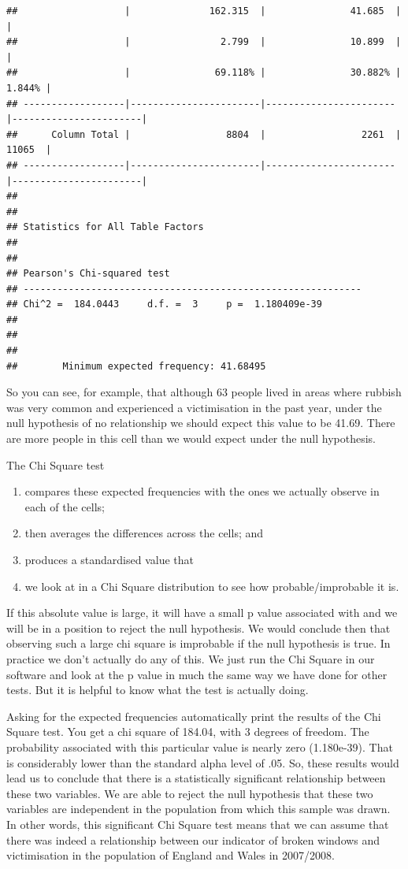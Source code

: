 \documentclass[]{book}
\providecommand{\tightlist}{%
  \setlength{\itemsep}{0pt}\setlength{\parskip}{0pt}}
\theoremstyle{definition}
\theoremstyle{definition}
\theoremstyle{definition}
\theoremstyle{remark}
\begin{document}
\begin{verbatim}
##                   |              162.315  |               41.685  |                       | 
##                   |                2.799  |               10.899  |                       | 
##                   |               69.118% |               30.882% |                1.844% | 
## ------------------|-----------------------|-----------------------|-----------------------|
##      Column Total |                 8804  |                 2261  |                11065  | 
## ------------------|-----------------------|-----------------------|-----------------------|
## 
##  
## Statistics for All Table Factors
## 
## 
## Pearson's Chi-squared test 
## ------------------------------------------------------------
## Chi^2 =  184.0443     d.f. =  3     p =  1.180409e-39 
## 
## 
##  
##        Minimum expected frequency: 41.68495
\end{verbatim}

So you can see, for example, that although 63 people lived in areas
where rubbish was very common and experienced a victimisation in the
past year, under the null hypothesis of no relationship we should expect
this value to be 41.69. There are more people in this cell than we would
expect under the null hypothesis.

The Chi Square test

\begin{enumerate}
\def\labelenumi{(\arabic{enumi})}
\tightlist
\item
  compares these expected frequencies with the ones we actually observe
  in each of the cells;
\item
  then averages the differences across the cells; and
\item
  produces a standardised value that
\item
  we look at in a Chi Square distribution to see how probable/improbable
  it is.
\end{enumerate}

If this absolute value is large, it will have a small p value associated
with and we will be in a position to reject the null hypothesis. We
would conclude then that observing such a large chi square is improbable
if the null hypothesis is true. In practice we don't actually do any of
this. We just run the Chi Square in our software and look at the p value
in much the same way we have done for other tests. But it is helpful to
know what the test is actually doing.

Asking for the expected frequencies automatically print the results of
the Chi Square test. You get a chi square of 184.04, with 3 degrees of
freedom. The probability associated with this particular value is nearly
zero (1.180e-39). That is considerably lower than the standard alpha
level of .05. So, these results would lead us to conclude that there is
a statistically significant relationship between these two variables. We
are able to reject the null hypothesis that these two variables are
independent in the population from which this sample was drawn. In other
words, this significant Chi Square test means that we can assume that
there was indeed a relationship between our indicator of broken windows
and victimisation in the population of England and Wales in 2007/2008.
\end{document}
